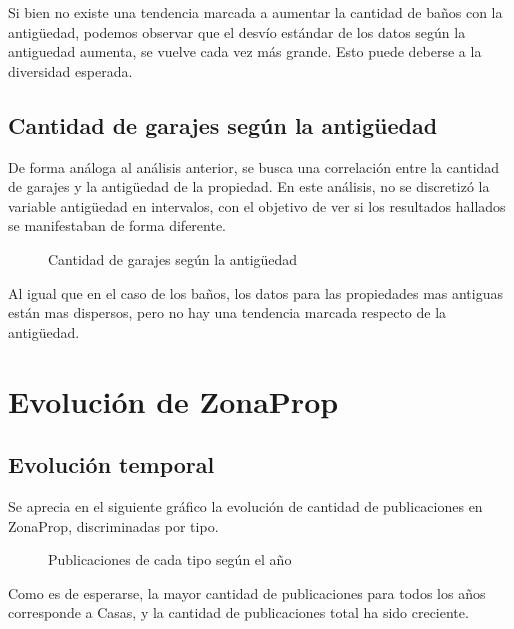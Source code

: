 \documentclass[
10pt, %
a4paper, %
oneside, %
headinclude,footinclude, %
BCOR5mm, %
]{scrartcl}
\begin{document}
    Si bien no existe una tendencia marcada a aumentar la cantidad de baños con la antigüedad, podemos observar que el desv\'io est\'andar de los datos seg\'un la antiguedad aumenta, se vuelve cada vez m\'as grande. Esto puede deberse a la diversidad esperada.
    
    \subsection{Cantidad de garajes según la antigüedad}
    De forma análoga al análisis anterior, se busca una correlación entre la cantidad de garajes y la antigüedad de la propiedad. En este análisis, no se discretizó la variable antigüedad en intervalos, con el objetivo de ver si los resultados hallados se manifestaban de forma diferente.
    
    \begin{figure}[H]
        \caption{Cantidad de garajes según la antigüedad}
        \label{fig:garajes-antiguedad}
    \end{figure}
    
    Al igual que en el caso de los baños, los datos para las propiedades mas antiguas están mas dispersos, pero no hay una tendencia marcada respecto de la antigüedad.
    
 
\newpage
\section{Evoluci\'on de ZonaProp}
    \subsection{Evoluci\'on temporal}
    Se aprecia en el siguiente gráfico la evolución de cantidad de publicaciones en ZonaProp, discriminadas por tipo. 
    \begin{figure}[H]
        \caption{Publicaciones de cada tipo según el año}
        \label{fig:publicaciones-anuales}
    \end{figure}
    Como es de esperarse, la mayor cantidad de publicaciones para todos los años corresponde a Casas, y la cantidad de publicaciones total ha sido creciente. 
\end{document}
